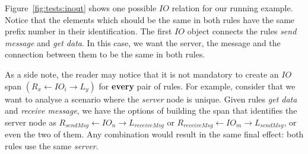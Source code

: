 \begin{example}\label{ex:inout} Figure~\ref{fig:tests:inout} shows one possible $IO$ relation for our running example. Notice that the elements which should be the same in both rules have the same prefix number in their identification. The first $IO$ object connects the rules \emph{send message} and \emph{get data}.  In this case, we want the server, the message and the connection between them to be the same in both rules. %

As a side note, the reader may notice that it is not mandatory to create an $IO$ span \mbox{$\left(R_x \leftarrow IO_i \rightarrow L_y\right)$} for \textbf{every} pair of rules. For example, consider that we want to analyse a scenario where the \emph{server} node is unique. Given rules \emph{get data} and \emph{receive message}, we have the options of building the span that identifies the server node as
  $R_{sendMsg} \leftarrow IO_n \rightarrow L_{receiveMsg}$ or $R_{receiveMsg} \leftarrow IO_m \rightarrow L_{sendMsg}$, or even the two of them. Any combination would result in the same final effect: both rules use the same \emph{server}.
  \begin{figure}[!ht]
  \centering

\end{figure}
\end{example}

